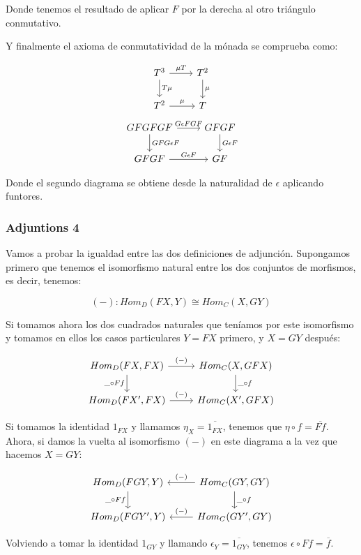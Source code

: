 \documentclass[11pt]{article}
\begin{document}
Donde tenemos el resultado de aplicar $F$ por la derecha al otro triángulo conmutativo.

Y finalmente el axioma de conmutatividad de la mónada se comprueba como:

\[ \begin{tikzcd}
T^3 \arrow{d}{T \mu} \arrow{r}{\mu T} & T^2 \arrow{d}{\mu} \\
T^2 \arrow{r}{\mu} & T
\end{tikzcd} \]  \[ \begin{tikzcd}
GFGFGF \arrow{d}{GFG \epsilon F} \arrow{r}{G \epsilon FGF} & GFGF \arrow{d}{G\epsilon F} \\
GFGF \arrow{r}{G \epsilon F} & GF
\end{tikzcd} \] 

Donde el segundo diagrama se obtiene desde la naturalidad de $\epsilon$ aplicando funtores.

\subsubsection*{Adjuntions 4}
\label{sec-2-1-4}
Vamos a probar la igualdad entre las dos definiciones de adjunción.
Supongamos primero que tenemos el isomorfismo natural entre los dos 
conjuntos de morfismos, es decir, tenemos:

\[ (-) : Hom_D(FX,Y) \cong Hom_C(X,GY) \]

Si tomamos ahora los dos cuadrados naturales que teníamos por este 
isomorfismo y tomamos en ellos los casos particulares $Y = FX$ primero,
y $X = GY$ después:

\[ \begin{tikzcd}
Hom_D(FX,FX) \arrow{d}[swap]{\_ \circ Ff} \arrow{r}{(-)} & Hom_C(X,GFX) \arrow{d}{\_\circ f}\\
Hom_D(FX', FX) \arrow{r}{(-)}& Hom_C(X',GFX)
\end{tikzcd}
\]

Si tomamos la identidad $1_{FX}$ y llamamos $\eta_X = \overline{1_{FX}}$, tenemos que
\(\eta \circ f = \overline{Ff}\). Ahora, si damos la vuelta al isomorfismo $(-)$ en este 
diagrama a la vez que hacemos $X = GY$:

\[ \begin{tikzcd}
Hom_D(FGY,Y) \arrow{d}[swap]{\_ \circ Ff}  & Hom_C(GY,GY) \arrow{l}[swap]{(-)} \arrow{d}{\_\circ f}\\
Hom_D(FGY',Y) & Hom_C(GY',GY) \arrow{l}[swap]{(-)}
\end{tikzcd}
\]

Volviendo a tomar la identidad $1_{GY}$ y llamando $\epsilon_Y = \overline{1_{GY}}$, tenemos
$\epsilon \circ Ff = \overline{f}$.
\end{document}

